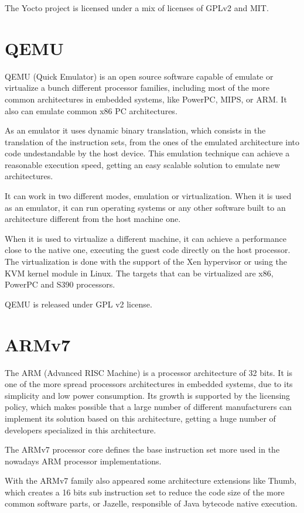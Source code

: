 \documentclass[a4paper,11pt,openany]{report}
\begin{document}
The Yocto project is licensed under a mix of licenses of GPLv2 and MIT.

\section{QEMU}
QEMU (Quick Emulator) is an open source software capable of emulate or virtualize a bunch different processor families, including most of the more common architectures in embedded systems, like PowerPC, MIPS, or ARM. It also can emulate common x86 PC architectures.

As an emulator it uses dynamic binary translation, which consists in the translation of the instruction sets, from the ones of the emulated architecture into code undestandable by the host device. This emulation technique can achieve a reasonable execution speed, getting an easy scalable solution to emulate new architectures.

It can work in two different modes, emulation or virtualization. When it is used as an emulator, it can run operating systems or any other software built to an architecture different from the host machine one.

When it is used to virtualize a different machine, it can achieve a performance close to the native one, executing the guest code directly on the host processor. The virtualization is done with the support of the Xen hypervisor or using the KVM kernel module in Linux. The targets that can be virtualized are x86, PowerPC and S390 processors.

QEMU is released under GPL v2 license.

\section{ARMv7}
The ARM (Advanced RISC Machine)\cite{arm} is a processor architecture of 32 bits. It is one of the more spread processors architectures in embedded systems, due to its simplicity and low power consumption. Its growth is supported by the licensing policy, which makes possible that a large number of different manufacturers can implement its solution based on this architecture, getting a huge number of developers specialized in this architecture.

The ARMv7 processor core defines the base instruction set more used in the nowadays ARM processor implementations.

With the ARMv7 family also appeared some architecture extensions like Thumb, which creates a 16 bits sub instruction set to reduce the code size of the more common software parts, or Jazelle, responsible of Java bytecode native execution.
\end{document}
